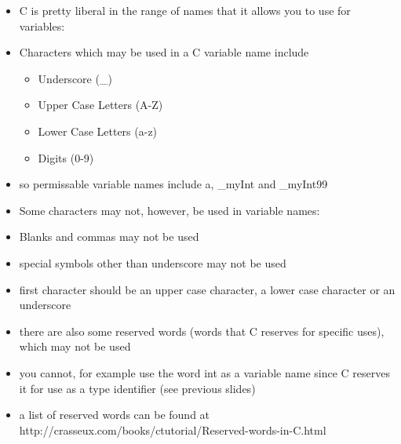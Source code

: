 \documentclass{beamer}
\begin{document}
\begin{frame}
\begin{itemize}
\item C is pretty liberal in the range of names that it allows you to use for variables:
\item Characters which may be used in a C variable name include
\begin{itemize}
\item Underscore (\_)
\item Upper Case Letters (A-Z)
\item Lower Case Letters (a-z)
\item Digits (0-9)
\end{itemize}
\item so permissable variable names include a, \_myInt and \_myInt99
\end{itemize}
\end{frame}

\begin{frame}
\begin{itemize}
\item Some characters may not, however, be used in variable names:
\item Blanks and commas may not be used
\item special symbols other than underscore may not be used

\item first character should be an upper case character, a lower case character or an underscore
\end{itemize}
\end{frame}


\begin{frame}
\begin{itemize}
\item there are also some reserved words (words that C reserves for specific uses), which may not be used
\item you cannot, for example use the word int as a variable name since C reserves it for use as a type identifier (see previous slides)
\item a list of reserved words can be found at http://crasseux.com/books/ctutorial/Reserved-words-in-C.html
\end{itemize}
\end{frame}
\end{document}
